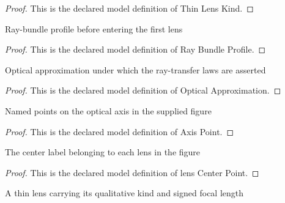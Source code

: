 \begin{proof}
  This is the declared model definition of Thin Lens Kind.
\end{proof}
\begin{definition}
  \label{def:physics:phyx-mini-0112:phyxminiproblems-problemphyxmini0112-raybundleprofile}
  Ray-bundle profile before entering the first lens
\end{definition}
\begin{proof}
  This is the declared model definition of Ray Bundle Profile.
\end{proof}
\begin{definition}
  \label{def:physics:phyx-mini-0112:phyxminiproblems-problemphyxmini0112-opticalapproximation}
  Optical approximation under which the ray-transfer laws are asserted
\end{definition}
\begin{proof}
  This is the declared model definition of Optical Approximation.
\end{proof}
\begin{definition}
  \label{def:physics:phyx-mini-0112:phyxminiproblems-problemphyxmini0112-axispoint}
  Named points on the optical axis in the supplied figure
\end{definition}
\begin{proof}
  This is the declared model definition of Axis Point.
\end{proof}
\begin{definition}
  \label{def:physics:phyx-mini-0112:phyxminiproblems-problemphyxmini0112-lenscenterpoint}
  The center label belonging to each lens in the figure
\end{definition}
\begin{proof}
  This is the declared model definition of lens Center Point.
\end{proof}
\begin{definition}
  \label{def:physics:phyx-mini-0112:phyxminiproblems-problemphyxmini0112-thinlens}
  A thin lens carrying its qualitative kind and signed focal length
\end{definition}
